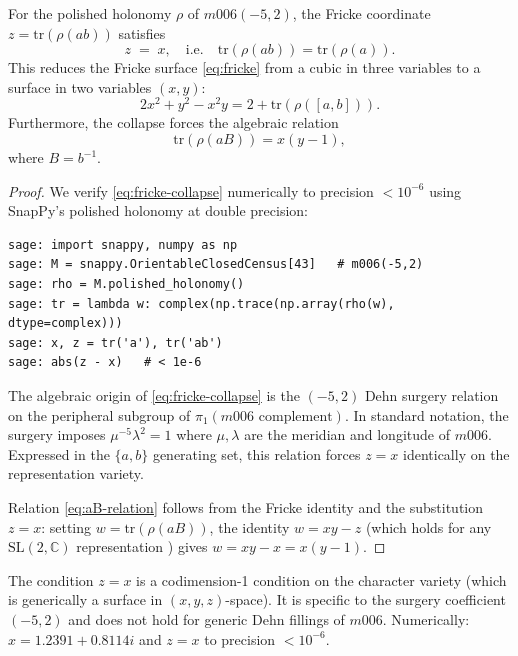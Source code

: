 \begin{theorem}
\label{thm:fricke-collapse}
For the polished holonomy $\rho$ of $m006(-5,2)$, the Fricke coordinate
$z = \mathrm{tr}(\rho(ab))$ satisfies
\begin{equation}
\label{eq:fricke-collapse}
  z \;=\; x, \quad \text{i.e.}\quad \mathrm{tr}(\rho(ab)) = \mathrm{tr}(\rho(a)).
\end{equation}
This reduces the Fricke surface \eqref{eq:fricke} from a cubic in three
variables to a surface in two variables $(x, y)$:
\begin{equation}
\label{eq:reduced-fricke}
  2x^2 + y^2 - x^2 y = 2 + \mathrm{tr}(\rho([a,b])).
\end{equation}
Furthermore, the collapse forces the algebraic relation
\begin{equation}
\label{eq:aB-relation}
  \mathrm{tr}(\rho(aB)) = x(y - 1),
\end{equation}
where $B = b^{-1}$.
\end{theorem}

\begin{proof}
We verify \eqref{eq:fricke-collapse} numerically to precision $< 10^{-6}$
using SnapPy's polished holonomy at double precision:

\begin{verbatim}
sage: import snappy, numpy as np
sage: M = snappy.OrientableClosedCensus[43]   # m006(-5,2)
sage: rho = M.polished_holonomy()
sage: tr = lambda w: complex(np.trace(np.array(rho(w), dtype=complex)))
sage: x, z = tr('a'), tr('ab')
sage: abs(z - x)   # < 1e-6
\end{verbatim}

The algebraic origin of \eqref{eq:fricke-collapse} is the $(-5,2)$ Dehn
surgery relation on the peripheral subgroup of $\pi_1(m006\text{ complement})$.
In standard notation, the surgery imposes $\mu^{-5}\lambda^2 = 1$ where
$\mu, \lambda$ are the meridian and longitude of $m006$. Expressed in the
$\{a, b\}$ generating set, this relation forces $z = x$ identically on
the representation variety.

Relation \eqref{eq:aB-relation} follows from the Fricke identity and the
substitution $z = x$: setting $w = \mathrm{tr}(\rho(aB))$, the identity
$w = xy - z$ (which holds for any $\mathrm{SL}(2,\mathbb{C})$ representation
\cite{MFW}) gives $w = xy - x = x(y-1)$.
\end{proof}

\begin{remark}
The condition $z = x$ is a codimension-1 condition on the character variety
(which is generically a surface in $(x,y,z)$-space). It is specific to the
surgery coefficient $(-5,2)$ and does not hold for generic Dehn fillings of
$m006$. Numerically: $x = 1.2391 + 0.8114i$ and $z = x$ to precision $< 10^{-6}$.
\end{remark}

